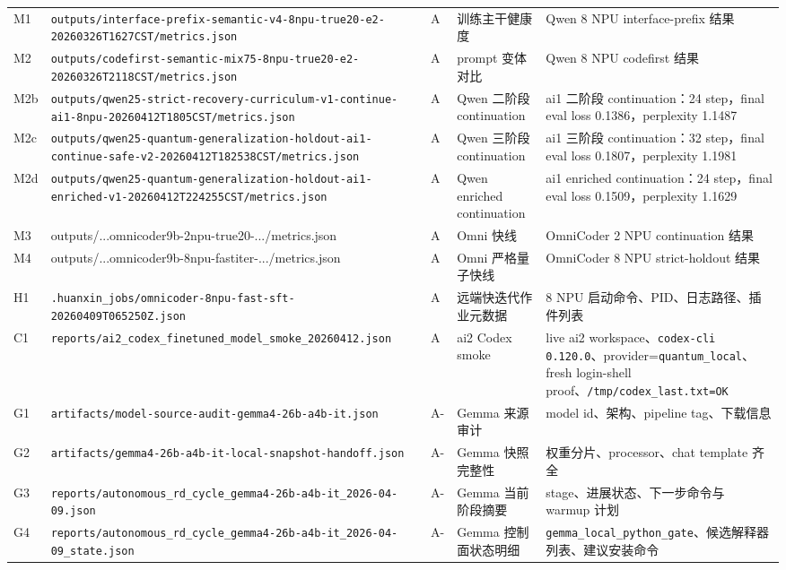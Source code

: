 \documentclass[11pt,a4paper]{article}
\newcommand{\code}[1]{\begingroup\ttfamily\footnotesize\nolinkurl{#1}\endgroup}
\begin{document}
\begin{longtable}{p{0.9cm} T{5.1cm} p{0.8cm} p{1.6cm} p{5.4cm}}
M1 & \code{outputs/interface-prefix-semantic-v4-8npu-true20-e2-20260326T1627CST/metrics.json} & A & 训练主干健康度 & Qwen 8 NPU interface-prefix 结果 \\
M2 & \code{outputs/codefirst-semantic-mix75-8npu-true20-e2-20260326T2118CST/metrics.json} & A & prompt 变体对比 & Qwen 8 NPU codefirst 结果 \\
M2b & \code{outputs/qwen25-strict-recovery-curriculum-v1-continue-ai1-8npu-20260412T1805CST/metrics.json} & A & Qwen 二阶段 continuation & ai1 二阶段 continuation：24 step，final eval loss 0.1386，perplexity 1.1487 \\
M2c & \code{outputs/qwen25-quantum-generalization-holdout-ai1-continue-safe-v2-20260412T182538CST/metrics.json} & A & Qwen 三阶段 continuation & ai1 三阶段 continuation：32 step，final eval loss 0.1807，perplexity 1.1981 \\
M2d & \code{outputs/qwen25-quantum-generalization-holdout-ai1-enriched-v1-20260412T224255CST/metrics.json} & A & Qwen enriched continuation & ai1 enriched continuation：24 step，final eval loss 0.1509，perplexity 1.1629 \\
M3 & \raggedright{\scriptsize\ttfamily outputs/...omnicoder9b-2npu-true20-.../metrics.json} & A & Omni 快线 & OmniCoder 2 NPU continuation 结果 \\
M4 & \raggedright{\scriptsize\ttfamily outputs/...omnicoder9b-8npu-fastiter-.../metrics.json} & A & Omni 严格量子快线 & OmniCoder 8 NPU strict-holdout 结果 \\
H1 & \code{.huanxin_jobs/omnicoder-8npu-fast-sft-20260409T065250Z.json} & A & 远端快迭代作业元数据 & 8 NPU 启动命令、PID、日志路径、插件列表 \\
C1 & \code{reports/ai2_codex_finetuned_model_smoke_20260412.json} & A & ai2 Codex smoke & live ai2 workspace、\code{codex-cli 0.120.0}、provider=\code{quantum\_local}、fresh login-shell proof、\code{/tmp/codex\_last.txt=OK} \\
G1 & \code{artifacts/model-source-audit-gemma4-26b-a4b-it.json} & A- & Gemma 来源审计 & model id、架构、pipeline tag、下载信息 \\
G2 & \code{artifacts/gemma4-26b-a4b-it-local-snapshot-handoff.json} & A- & Gemma 快照完整性 & 权重分片、processor、chat template 齐全 \\
G3 & \code{reports/autonomous_rd_cycle_gemma4-26b-a4b-it_2026-04-09.json} & A- & Gemma 当前阶段摘要 & stage、进展状态、下一步命令与 warmup 计划 \\
G4 & \code{reports/autonomous_rd_cycle_gemma4-26b-a4b-it_2026-04-09\_state.json} & A- & Gemma 控制面状态明细 & \code{gemma\_local\_python\_gate}、候选解释器列表、建议安装命令 \\

\end{longtable}
\end{document}
